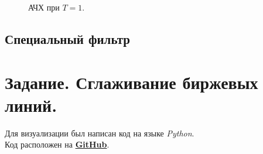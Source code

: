 \documentclass[a5paper, 10pt]{article}
\theoremstyle{definition}
\theoremstyle{plain}
\theoremstyle{remark}
\begin{document}
\begin{figure}[h!]
\caption{АЧХ при $T = 1$.}
\end{figure}






\newpage
\subsection{Специальный фильтр}









\newpage
\section{Задание. Сглаживание биржевых линий.}


\newpage
Для визуализации был написан код на языке \textit{Python}. \\
Код расположен на \href{https://github.com/a-nechaeva/practical_Linal/tree/main/lab4}{\textbf{GitHub}}.
\end{document}

